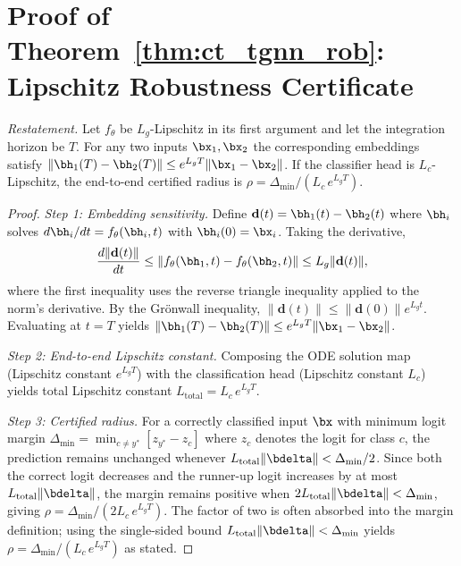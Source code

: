 \section{Proof of Theorem~\ref{thm:ct_tgnn_rob}: Lipschitz Robustness Certificate}
\label{app:proof_ct_rob}

\noindent\textit{Restatement.} Let $f_\theta$ be $L_g$-Lipschitz in its first argument and let the integration horizon be $T$. For any two inputs $\bx_1,\bx_2$ the corresponding embeddings satisfy $\|\bh_1(T)-\bh_2(T)\|\le e^{L_g T}\|\bx_1-\bx_2\|$. If the classifier head is $L_c$-Lipschitz, the end-to-end certified radius is $\rho = \Delta_{\min}/(L_c\,e^{L_g T})$.

\begin{proof}
\textit{Step 1: Embedding sensitivity.} Define $\mathbf{d}(t) = \bh_1(t)-\bh_2(t)$ where $\bh_i$ solves $d\bh_i/dt = f_\theta(\bh_i,t)$ with $\bh_i(0)=\bx_i$. Taking the derivative,
\begin{equation}
\frac{d\|\mathbf{d}(t)\|}{dt}
\le \|f_\theta(\bh_1,t)-f_\theta(\bh_2,t)\|
\le L_g\|\mathbf{d}(t)\|,
\end{equation}
where the first inequality uses the reverse triangle inequality applied to the norm's derivative. By the Gr\"{o}nwall inequality, $\|\mathbf{d}(t)\|\le\|\mathbf{d}(0)\|e^{L_g t}$. Evaluating at $t=T$ yields $\|\bh_1(T)-\bh_2(T)\|\le e^{L_g T}\|\bx_1-\bx_2\|$.

\textit{Step 2: End-to-end Lipschitz constant.} Composing the ODE solution map (Lipschitz constant $e^{L_g T}$) with the classification head (Lipschitz constant $L_c$) yields total Lipschitz constant $L_{\mathrm{total}} = L_c\,e^{L_g T}$.

\textit{Step 3: Certified radius.} For a correctly classified input $\bx$ with minimum logit margin $\Delta_{\min}=\min_{c\neq y^*}[z_{y^*}-z_c]$ where $z_c$ denotes the logit for class $c$, the prediction remains unchanged whenever $L_{\mathrm{total}}\|\bdelta\|<\Delta_{\min}/2$. Since both the correct logit decreases and the runner-up logit increases by at most $L_{\mathrm{total}}\|\bdelta\|$, the margin remains positive when $2L_{\mathrm{total}}\|\bdelta\|<\Delta_{\min}$, giving $\rho = \Delta_{\min}/(2L_c\,e^{L_g T})$. The factor of two is often absorbed into the margin definition; using the single-sided bound $L_{\mathrm{total}}\|\bdelta\|<\Delta_{\min}$ yields $\rho = \Delta_{\min}/(L_c\,e^{L_g T})$ as stated.
\end{proof}


